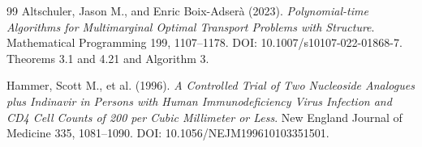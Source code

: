 \documentclass{article}
\begin{document}
\begin{thebibliography}{99}
   Altschuler, Jason M., and Enric Boix-Adser\`a (2023). \emph{Polynomial-time Algorithms for Multimarginal Optimal Transport Problems with Structure}. Mathematical Programming 199, 1107--1178. DOI: 10.1007/s10107-022-01868-7. Theorems 3.1 and 4.21 and Algorithm 3.

   Hammer, Scott M., et al. (1996). \emph{A Controlled Trial of Two Nucleoside Analogues plus Indinavir in Persons with Human Immunodeficiency Virus Infection and CD4 Cell Counts of 200 per Cubic Millimeter or Less}. New England Journal of Medicine 335, 1081--1090. DOI: 10.1056/NEJM199610103351501.

\end{thebibliography}
\end{document}
